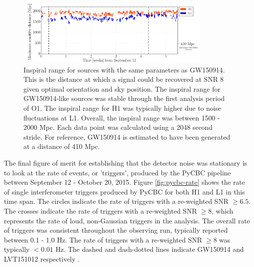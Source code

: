 \begin{figure}[ht!]%
\includegraphics[width=0.85\textwidth]{figures/O1/inspiral-range}
\caption[Inspiral range in O1]{Inspiral range for sources with %
         the same parameters as GW150914. This is the distance at %
         which a signal could be recovered at SNR 8 given optimal %
         orientation and sky position. The inspiral range for %
         GW150914-like sources was stable through the first analysis %
         period of O1. The inspiral %
         range for H1 was typically higher due to noise fluctuations %
         at L1. Overall, the inspiral range was between 1500 - 2000 Mpc. %
         Each data point was calculated using a 2048 second stride. %
         For reference, GW150914 is estimated to have been generated at a %
         distance of 410 Mpc. %
         }
\label{fig:inspiral-range}
\end{figure}

The final figure of merit for establishing that the detector noise was 
stationary is to look at the rate of events, or 'triggers', produced by the PyCBC pipeline 
between September 12 - October 20, 2015. 
Figure \ref{fig:pycbc-rate} shows 
the rate of single 
interferometer triggers produced by PyCBC for both H1 and L1 in this time 
span. The circles indicate the rate of triggers with a re-weighted SNR 
$\geq 6.5$. The crosses indicate the rate of triggers with a re-weighted SNR 
$\geq 8$, which represents the rate of loud, non-Gaussian triggers in the 
analysis. The overall rate of triggers was consistent throughout the 
observing run, typically reported between 0.1 - 1.0 Hz. The rate of triggers 
with a re-weighted SNR $\geq 8$ was typically $< 0.01$ Hz. The dashed 
and dash-dotted lines indicate GW150914 and LVT151012 respectively 
\cite{GW150914-DETCHAR}. 

